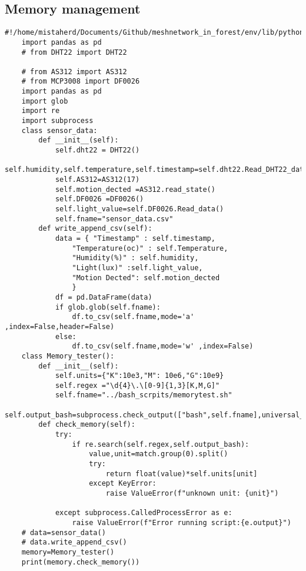 \subsection{Memory management}
\begin{lstlisting}[style=mystyle,caption={Code for Memory management}]
    #!/home/mistaherd/Documents/Github/meshnetwork_in_forest/env/lib/python3.11
    import pandas as pd
    # from DHT22 import DHT22

    # from AS312 import AS312
    # from MCP3008 import DF0026
    import pandas as pd
    import glob
    import re 
    import subprocess
    class sensor_data:
        def __init__(self):
            self.dht22 = DHT22()
            self.humidity,self.temperature,self.timestamp=self.dht22.Read_DHT22_data()
            self.AS312=AS312(17)
            self.motion_dected =AS312.read_state()
            self.DF0026 =DF0026()
            self.light_value=self.DF0026.Read_data()
            self.fname="sensor_data.csv"
        def write_append_csv(self):
            data = { "Timestamp" : self.timestamp,
                "Temperature(oc)" : self.Temperature,
                "Humidity(%)" : self.humidity,
                "Light(lux)" :self.light_value,
                "Motion Dected": self.motion_dected
                }
            df = pd.DataFrame(data)
            if glob.glob(self.fname):	
                df.to_csv(self.fname,mode='a' ,index=False,header=False)
            else:
                df.to_csv(self.fname,mode='w' ,index=False)
    class Memory_tester():
        def __init__(self):
            self.units={"K":10e3,"M": 10e6,"G":10e9}
            self.regex ="\d{4}\.\[0-9]{1,3}[K,M,G]"
            self.fname="../bash_scrpits/memorytest.sh" 
            self.output_bash=subprocess.check_output(["bash",self.fname],universal_newlines=True)
        def check_memory(self):
            try:
                if re.search(self.regex,self.output_bash):
                    value,unit=match.group(0).split()
                    try:
                        return float(value)*self.units[unit]
                    except KeyError:
                        raise ValueError(f"unknown unit: {unit}")
                
            except subprocess.CalledProcessError as e:
                raise ValueError(f"Error running script:{e.output}")
    # data=sensor_data()
    # data.write_append_csv()
    memory=Memory_tester()
    print(memory.check_memory())
\end{lstlisting}